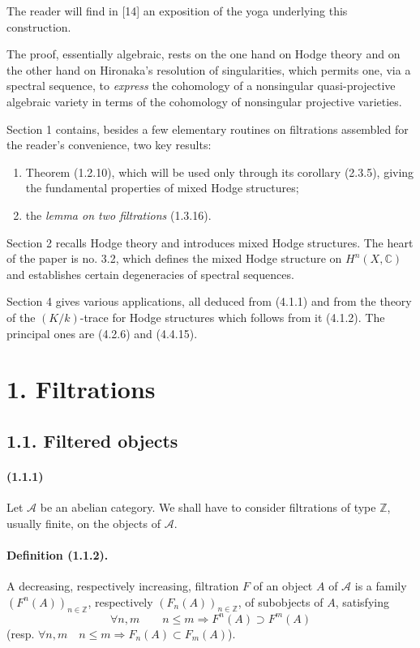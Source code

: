 \documentclass[10pt]{article}
\newcommand{\C}{\mathbb C}
\newcommand{\Z}{\mathbb Z}
\newcommand{\calA}{\mathcal A}
\begin{document}
The reader will find in [14] an exposition of the yoga underlying this construction.

The proof, essentially algebraic, rests on the one hand on Hodge theory and on the other hand on Hironaka's resolution of singularities, which permits one, via a spectral sequence, to \emph{express} the cohomology of a nonsingular quasi-projective algebraic variety in terms of the cohomology of nonsingular projective varieties.

Section 1 contains, besides a few elementary routines on filtrations assembled for the reader's convenience, two key results:
\begin{enumerate}[label=\alph*)]
\item Theorem (1.2.10), which will be used only through its corollary (2.3.5), giving the fundamental properties of mixed Hodge structures;
\item the \emph{lemma on two filtrations} (1.3.16).
\end{enumerate}
Section 2 recalls Hodge theory and introduces mixed Hodge structures. The heart of the paper is no. 3.2, which defines the mixed Hodge structure on $H^n(X,\C)$ and establishes certain degeneracies of spectral sequences.

Section 4 gives various applications, all deduced from (4.1.1) and from the theory of the $(K/k)$-trace for Hodge structures which follows from it (4.1.2). The principal ones are (4.2.6) and (4.4.15).

\section*{1. Filtrations}
\subsection*{1.1. Filtered objects}

\paragraph{(1.1.1)} Let $\calA$ be an abelian category. We shall have to consider filtrations of type $\Z$, usually finite, on the objects of $\calA$.

\paragraph{Definition (1.1.2).} A decreasing, respectively increasing, filtration $F$ of an object $A$ of $\calA$ is a family $(F^n(A))_{n\in\Z}$, respectively $(F_n(A))_{n\in\Z}$, of subobjects of $A$, satisfying
\[
\forall n,m\qquad n\le m\Rightarrow F^n(A)\supset F^m(A)
\]
(resp. $\forall n,m\quad n\le m\Rightarrow F_n(A)\subset F_m(A)$).
\end{document}
